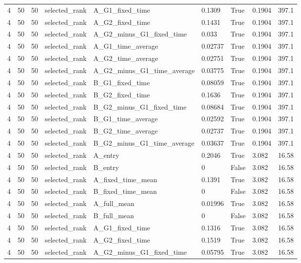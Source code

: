 \begin{longtable}{lllllllll}
4 & 50 & 50 & selected\_rank & A\_G1\_fixed\_time & 0.1309 & True & 0.1904 & 397.1 \\
4 & 50 & 50 & selected\_rank & A\_G2\_fixed\_time & 0.1431 & True & 0.1904 & 397.1 \\
4 & 50 & 50 & selected\_rank & A\_G2\_minus\_G1\_fixed\_time & 0.033 & True & 0.1904 & 397.1 \\
4 & 50 & 50 & selected\_rank & A\_G1\_time\_average & 0.02737 & True & 0.1904 & 397.1 \\
4 & 50 & 50 & selected\_rank & A\_G2\_time\_average & 0.02751 & True & 0.1904 & 397.1 \\
4 & 50 & 50 & selected\_rank & A\_G2\_minus\_G1\_time\_average & 0.03775 & True & 0.1904 & 397.1 \\
4 & 50 & 50 & selected\_rank & B\_G1\_fixed\_time & 0.08059 & True & 0.1904 & 397.1 \\
4 & 50 & 50 & selected\_rank & B\_G2\_fixed\_time & 0.1636 & True & 0.1904 & 397.1 \\
4 & 50 & 50 & selected\_rank & B\_G2\_minus\_G1\_fixed\_time & 0.08684 & True & 0.1904 & 397.1 \\
4 & 50 & 50 & selected\_rank & B\_G1\_time\_average & 0.02592 & True & 0.1904 & 397.1 \\
4 & 50 & 50 & selected\_rank & B\_G2\_time\_average & 0.02737 & True & 0.1904 & 397.1 \\
4 & 50 & 50 & selected\_rank & B\_G2\_minus\_G1\_time\_average & 0.03637 & True & 0.1904 & 397.1 \\
4 & 50 & 50 & selected\_rank & A\_entry & 0.2046 & True & 3.082 & 16.58 \\
4 & 50 & 50 & selected\_rank & B\_entry & 0 & False & 3.082 & 16.58 \\
4 & 50 & 50 & selected\_rank & A\_fixed\_time\_mean & 0.1391 & True & 3.082 & 16.58 \\
4 & 50 & 50 & selected\_rank & B\_fixed\_time\_mean & 0 & False & 3.082 & 16.58 \\
4 & 50 & 50 & selected\_rank & A\_full\_mean & 0.01996 & True & 3.082 & 16.58 \\
4 & 50 & 50 & selected\_rank & B\_full\_mean & 0 & False & 3.082 & 16.58 \\
4 & 50 & 50 & selected\_rank & A\_G1\_fixed\_time & 0.1316 & True & 3.082 & 16.58 \\
4 & 50 & 50 & selected\_rank & A\_G2\_fixed\_time & 0.1519 & True & 3.082 & 16.58 \\
4 & 50 & 50 & selected\_rank & A\_G2\_minus\_G1\_fixed\_time & 0.05795 & True & 3.082 & 16.58 \\

\end{longtable}
